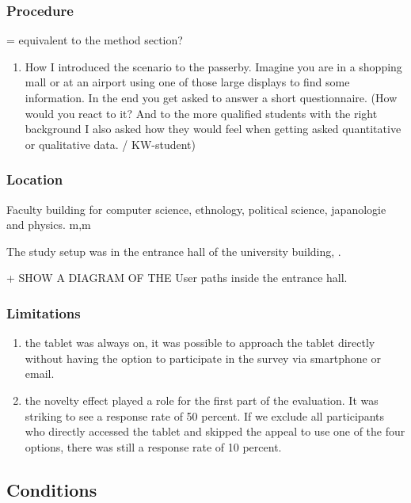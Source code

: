 	\subsubsection{Procedure}
		= equivalent to the method section?



		\begin{enumerate}
		\item How I introduced the scenario to the passerby. Imagine you are in a shopping mall or at an airport using one of those large displays to find some information. In the end you get asked to answer a short questionnaire. (How would you react to it? And to the more qualified students with the right background I also asked how they would feel when getting asked quantitative or qualitative data. / KW-student) 
		\end{enumerate}


	\subsubsection{Location}

	Faculty building for computer science, ethnology, political science, japanologie and physics. m,m

	The study setup was in the entrance hall of the university building, .

	+ SHOW A DIAGRAM OF THE User paths inside the entrance hall.


	\subsubsection{Limitations}

	\begin{enumerate}
	\item the tablet was always on, it was possible to approach the tablet directly without having the option to participate in the survey via smartphone or email. 
	\item the novelty effect played a role for the first part of the evaluation. It was striking to see a response rate of 50 percent. If we exclude all participants who directly accessed the tablet and skipped the appeal to use one of the four options, there was still a response rate of 10 percent.
	\end{enumerate}



\subsection{Conditions}

